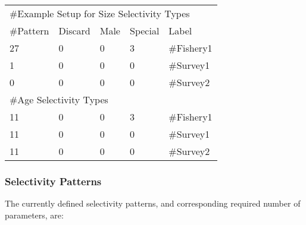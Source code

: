 \begin{center}
	\begin{longtable}{p{2cm} p{2cm} p{2cm} p{2cm} p{3cm} }
		\hline
		\multicolumn{5}{l}{\#Example Setup for Size Selectivity Types}\\
		\#Pattern & Discard & Male & Special & Label \\
		\hline
		27 & 0 & 0 & 3 & \#Fishery1\\
		1  & 0 & 0 & 0 & \#Survey1\\
		0  & 0 & 0 & 0 & \#Survey2\\
		\multicolumn{5}{l}{\#Age Selectivity Types}\\
		\hline
		11 & 0 & 0 & 3 & \#Fishery1\\
		11  & 0 & 0 & 0 & \#Survey1\\
		11  & 0 & 0 & 0 & \#Survey2\\
		\hline
	\end{longtable}
\end{center}

\subsubsection{Selectivity Patterns}
The currently defined selectivity patterns, and corresponding required number of parameters, are:

